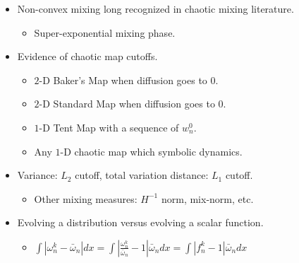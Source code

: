 \documentclass[12pt,t]{beamer}
\begin{document}
\begin{frame}
  \begin{itemize}
    \item Non-convex mixing long recognized in chaotic mixing literature.
      \begin{itemize}
       \item Super-exponential mixing phase.
      \end{itemize}
    \item Evidence of chaotic map cutoffs.
    \begin{itemize}
     \item $2$-D Baker's Map when diffusion goes to $0$.
     \item $2$-D Standard Map when diffusion goes to $0$.
     \item $1$-D Tent Map with a sequence of $w_n^0$.
     \item Any $1$-D chaotic map which symbolic dynamics.
    \end{itemize}
    \item Variance: $L_2$ cutoff, total variation distance: $L_1$ cutoff.
         \begin{itemize}
          \item Other mixing measures: $H^{-1}$ norm, mix-norm, etc. 
         \end{itemize}
    \item Evolving a distribution versus evolving a scalar function.
         \begin{itemize}
         \item $\int |\omega^k_n-\bar{\omega}_n| dx 
                = \int| \frac{\omega^k_n}{\bar{\omega}_n}-1|\bar{\omega}_n dx 
                = \int| f_n^k-1|\bar{\omega}_n dx $
         \end{itemize}
  \end{itemize}
\end{frame}
\end{document}
